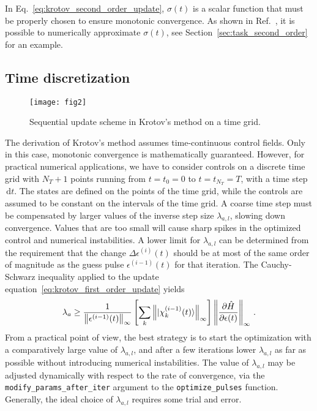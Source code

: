 \documentclass[submission, Phys]{SciPost}
\newcommand{\Op}[1]{\hat{#1}}
\newcommand{\dd}[0]{\,\text{d}}
\newcommand{\Norm}[1]{\left\lVert#1\right\rVert}
\begin{document}
In Eq.~\eqref{eq:krotov_second_order_update}, \(\sigma(t)\) is a scalar function
that must be properly chosen to ensure monotonic convergence.
As shown in Ref.~\cite{ReichJCP12}, it is possible to numerically approximate
\(\sigma(t)\), see Section~\ref{sec:task_second_order} for an example.


\subsection{Time discretization}%
\label{apx:krotov_update_discretization}

\begin{figure}[tb]
\centering \texttt{[image: fig2]}
  \caption{Sequential update scheme in Krotov's method on a time grid.}%
\label{fig:krotovscheme}
\end{figure}

The derivation of Krotov's method assumes time-continuous control fields.
Only in this case, monotonic convergence is mathematically guaranteed.
However, for practical numerical applications, we have to consider controls on
a discrete time grid with \(N_T + 1\) points running from \(t=t_0=0\) to
\(t=t_{N_T} = T\), with a time step \(\dd t\).
The states are defined on the points of the time grid,
while the controls are assumed to be constant on the intervals of the time grid.
A coarse time step must be compensated by larger values of the inverse step size
\(\lambda_{a,l}\), slowing down convergence.
Values that are too small will cause sharp spikes in the optimized control and
numerical instabilities.
A lower limit for \(\lambda_{a,l}\) can be determined from the requirement that
the change \(\Delta\epsilon^{(i)}(t)\) should be at most of the same order of
magnitude as the guess pulse \(\epsilon^{(i-1)}(t)\) for that iteration.
The Cauchy-Schwarz inequality applied to the update
equation~\eqref{eq:krotov_first_order_update} yields
\begin{equation}
  \lambda_a \ge
  \frac{1}{\Norm{\epsilon^{(i-1)}(t)}_{\infty}} \left[ \sum_{k}
    \Norm{\ket{\chi^{(i-1)}_k(t)}}_{\infty} \right]
    \Norm{\frac{\partial \Op{H}}{\partial \epsilon(t)}}_{\infty}\,.
\end{equation}
From a practical point of view, the best strategy is to start the optimization
with a comparatively large value of \(\lambda_{a,l}\), and after a few
iterations lower \(\lambda_{a,l}\) as far as possible without introducing
numerical instabilities.
The value of \(\lambda_{a,l}\) may be adjusted dynamically with respect to the
rate of convergence, via the \texttt{modify\_params\_after\_iter} argument to
the \texttt{optimize\_pulses} function.
Generally, the ideal choice of \(\lambda_{a,l}\) requires some trial and error.
\end{document}
